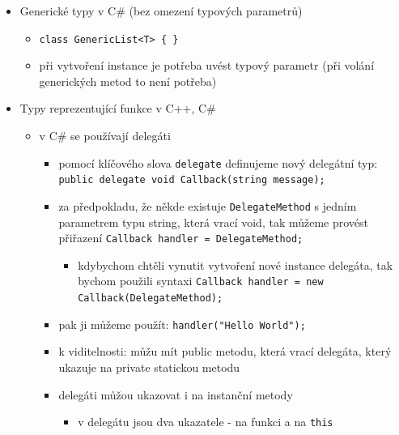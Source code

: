 \begin{itemize}
\begin{itemize}
\begin{itemize}
\item templatovaná funkce
\item v C\# třeba pomocí generické metody a omezení na IComparable
\end{itemize}
\end{itemize}
\item Generické typy v C\# (bez omezení typových parametrů)
\begin{itemize}
\item \texttt{class \allowbreak{}GenericList\textless{}T\textgreater{}\allowbreak{} \allowbreak{}\{ \allowbreak{}\}\allowbreak{}}
\item při vytvoření instance je potřeba uvést typový parametr (při volání generických metod to není potřeba)
\end{itemize}
\item Typy reprezentující funkce v C++, C\#
\begin{itemize}
\item v C\# se používají delegáti
\begin{itemize}
\item pomocí klíčového slova \texttt{delegate} definujeme nový delegátní typ: \texttt{public \allowbreak{}delegate \allowbreak{}void \allowbreak{}Callback(\allowbreak{}string \allowbreak{}message)\allowbreak{};\allowbreak{}}
\item za předpokladu, že někde existuje \texttt{DelegateMethod} s jedním parametrem typu string, která vrací void, tak můžeme provést přiřazení \texttt{Callback \allowbreak{}handler \allowbreak{}= \allowbreak{}DelegateMethod;\allowbreak{}}
\begin{itemize}
\item kdybychom chtěli vynutit vytvoření nové instance delegáta, tak bychom použili syntaxi \texttt{Callback \allowbreak{}handler \allowbreak{}= \allowbreak{}new \allowbreak{}Callback(\allowbreak{}DelegateMethod)\allowbreak{};\allowbreak{}}
\end{itemize}
\item pak ji můžeme použít: \texttt{handler(\allowbreak{}"Hello \allowbreak{}World")\allowbreak{};\allowbreak{}}
\item k viditelnosti: můžu mít public metodu, která vrací delegáta, který ukazuje na private statickou metodu
\item delegáti můžou ukazovat i na instanční metody
\begin{itemize}
\item v delegátu jsou dva ukazatele - na funkci a na \texttt{this}

\end{itemize}
\end{itemize}
\end{itemize}
\end{itemize}
